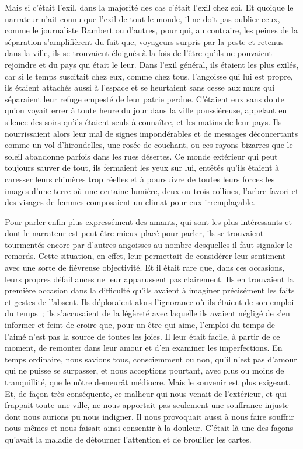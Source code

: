 \documentclass[french,twoside]{book} %
\begin{document}
Mais si c’était l’exil, dans la majorité des cas c’était l’exil chez soi. Et quoique le narrateur n’ait connu que l’exil de tout le monde, il ne doit pas oublier ceux, comme le journaliste Rambert ou d’autres, pour qui, au contraire, les peines de la séparation s’amplifièrent du fait que, voyageurs surpris par la peste et retenus dans la ville, ils se trouvaient éloignés à la fois de l’être qu’ils ne pouvaient rejoindre et du pays qui était le leur. Dans l’exil général, ils étaient les plus exilés, car si le temps suscitait chez eux, comme chez tous, l’angoisse qui lui est propre, ils étaient attachés aussi à l’espace et se heurtaient sans cesse aux murs qui séparaient leur refuge empesté de leur patrie perdue. C’étaient eux sans doute qu’on voyait errer à toute heure du jour dans la ville poussiéreuse, appelant en silence des soirs qu’ils étaient seuls à connaître, et les matins de leur pays. Ils nourrissaient alors leur mal de signes impondérables et de messages déconcertants comme un vol d’hirondelles, une rosée de couchant, ou ces rayons bizarres que le soleil abandonne parfois dans les rues désertes. Ce monde extérieur qui peut toujours sauver de tout, ils fermaient les yeux sur lui, entêtés qu’ils étaient à caresser leurs chimères trop réelles et à poursuivre de toutes leurs forces les images d’une terre où une certaine lumière, deux ou trois collines, l’arbre favori et des visages de femmes composaient un climat pour eux irremplaçable.\par
Pour parler enfin plus expressément des amants, qui sont les plus intéressants et dont le narrateur est peut-être mieux placé pour parler, ils se trouvaient tourmentés encore par d’autres angoisses au nombre desquelles il faut signaler le remords. Cette situation, en effet, leur permettait de considérer leur sentiment avec une sorte de fiévreuse objectivité. Et il était rare que, dans ces occasions, leurs propres défaillances ne leur apparussent pas clairement. Ils en trouvaient la première occasion dans la difficulté qu’ils avaient à imaginer précisément les faits et gestes de l’absent. Ils déploraient alors l’ignorance où ils étaient de son emploi du temps ; ils s’accusaient de la légèreté avec laquelle ils avaient négligé de s’en informer et feint de croire que, pour un être qui aime, l’emploi du temps de l’aimé n’est pas la source de toutes les joies. Il leur était facile, à partir de ce moment, de remonter dans leur amour et d’en examiner les imperfections. En temps ordinaire, nous savions tous, consciemment ou non, qu’il n’est pas d’amour qui ne puisse se surpasser, et nous acceptions pourtant, avec plus ou moins de tranquillité, que le nôtre demeurât médiocre. Mais le souvenir est plus exigeant. Et, de façon très conséquente, ce malheur qui nous venait de l’extérieur, et qui frappait toute une ville, ne nous apportait pas seulement une souffrance injuste dont nous aurions pu nous indigner. Il nous provoquait aussi à nous faire souffrir nous-mêmes et nous faisait ainsi consentir à la douleur. C’était là une des façons qu’avait la maladie de détourner l’attention et de brouiller les cartes.\par
\end{document}
